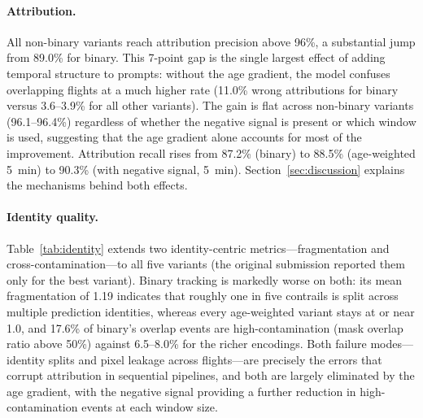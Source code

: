 \documentclass[1p,11pt]{elsarticle}
\begin{document}
\paragraph{Attribution.} All non-binary variants reach attribution precision above 96\%, a substantial jump from 89.0\% for binary. This 7-point gap is the single largest effect of adding temporal structure to prompts: without the age gradient, the model confuses overlapping flights at a much higher rate (11.0\% wrong attributions for binary versus 3.6--3.9\% for all other variants). The gain is flat across non-binary variants (96.1--96.4\%) regardless of whether the negative signal is present or which window is used, suggesting that the age gradient alone accounts for most of the improvement. Attribution recall rises from 87.2\% (binary) to 88.5\% (age-weighted 5~min) to 90.3\% (with negative signal, 5~min). Section~\ref{sec:discussion} explains the mechanisms behind both effects.

\paragraph{Identity quality.} Table~\ref{tab:identity} extends two identity-centric metrics---fragmentation and cross-contamination---to all five variants (the original submission reported them only for the best variant). Binary tracking is markedly worse on both: its mean fragmentation of 1.19 indicates that roughly one in five contrails is split across multiple prediction identities, whereas every age-weighted variant stays at or near 1.0, and 17.6\% of binary's overlap events are high-contamination (mask overlap ratio above 50\%) against 6.5--8.0\% for the richer encodings. Both failure modes---identity splits and pixel leakage across flights---are precisely the errors that corrupt attribution in sequential pipelines, and both are largely eliminated by the age gradient, with the negative signal providing a further reduction in high-contamination events at each window size.
\end{document}

